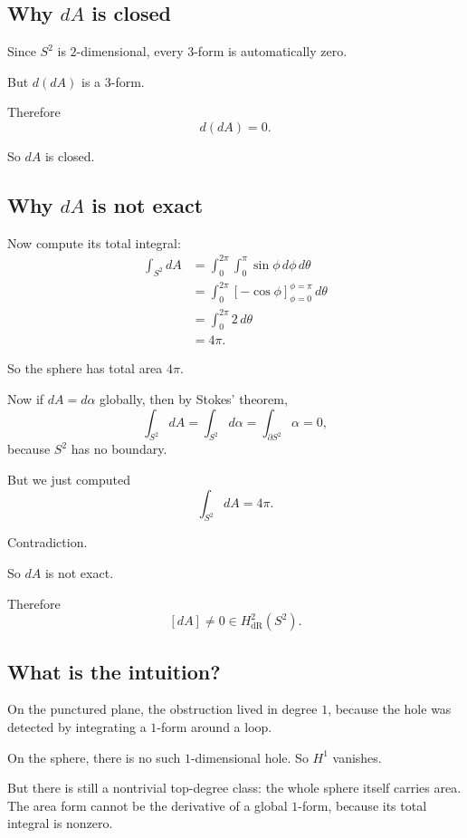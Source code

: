 \documentclass[11pt]{article}
\begin{document}
	\subsection{Why \(dA\) is closed}
	
	Since \(S^2\) is \(2\)-dimensional, every \(3\)-form is automatically zero.
	
	But \(d(dA)\) is a \(3\)-form.
	
	Therefore
	\[
	d(dA)=0.
	\]
	
	So \(dA\) is closed.
	
	\subsection{Why \(dA\) is not exact}
	
	Now compute its total integral:
	\begin{align*}
		\int_{S^2} dA
		&=
		\int_0^{2\pi}\int_0^\pi \sin\phi\,d\phi\,d\theta\\
		&=
		\int_0^{2\pi}\left[-\cos\phi\right]_{\phi=0}^{\phi=\pi}\,d\theta\\
		&=
		\int_0^{2\pi}2\,d\theta\\
		&=
		4\pi.
	\end{align*}
	
	So the sphere has total area \(4\pi\).
	
	Now if \(dA=d\alpha\) globally, then by Stokes' theorem,
	\[
	\int_{S^2} dA=\int_{S^2} d\alpha=\int_{\partial S^2}\alpha=0,
	\]
	because \(S^2\) has no boundary.
	
	But we just computed
	\[
	\int_{S^2} dA=4\pi.
	\]
	
	Contradiction.
	
	So \(dA\) is not exact.
	
	Therefore
	\[
	[dA]\neq 0\in H^2_{\mathrm{dR}}(S^2).
	\]
	
	\subsection{What is the intuition?}
	
	On the punctured plane, the obstruction lived in degree \(1\), because the hole was detected by integrating a \(1\)-form around a loop.
	
	On the sphere, there is no such \(1\)-dimensional hole. So \(H^1\) vanishes.
	
	But there is still a nontrivial top-degree class: the whole sphere itself carries area. The area form cannot be the derivative of a global \(1\)-form, because its total integral is nonzero.
	
\end{document}
